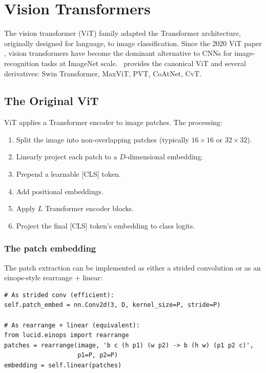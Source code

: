 \chapter{Vision Transformers}
\label{ch:vision_transformers}

The vision transformer (ViT) family adapted the Transformer
architecture, originally designed for language, to image
classification. Since the 2020 ViT paper
\cite{dosovitskiy_vit_2021}, vision transformers have become
the dominant alternative to CNNs for image-recognition tasks at
ImageNet scale. \Lucid\ provides the canonical ViT and several
derivatives: Swin Transformer, MaxViT, PVT, CoAtNet, CvT.

\section{The Original ViT}
\label{sec:vision_transformers:vit}

ViT \cite{dosovitskiy_vit_2021} applies a Transformer encoder
to image patches. The processing:

\begin{enumerate}
  \item Split the image into non-overlapping patches (typically
    $16 \times 16$ or $32 \times 32$).
  \item Linearly project each patch to a $D$-dimensional
    embedding.
  \item Prepend a learnable [CLS] token.
  \item Add positional embeddings.
  \item Apply $L$ Transformer encoder blocks.
  \item Project the final [CLS] token's embedding to class
    logits.
\end{enumerate}

\subsection{The patch embedding}
\label{ssec:vision_transformers:patch_embed}

The patch extraction can be implemented as either a strided
convolution or as an einops-style rearrange + linear:

\begin{lstlisting}[style=lucid,language=LucidPython]
# As strided conv (efficient):
self.patch_embed = nn.Conv2d(3, D, kernel_size=P, stride=P)

# As rearrange + linear (equivalent):
from lucid.einops import rearrange
patches = rearrange(image, 'b c (h p1) (w p2) -> b (h w) (p1 p2 c)',
                    p1=P, p2=P)
embedding = self.linear(patches)
\end{lstlisting}

